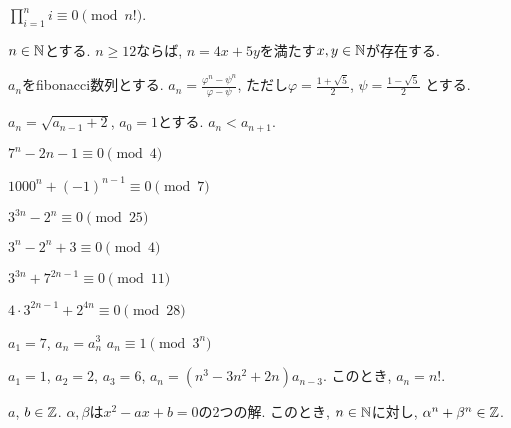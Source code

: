 \begin{prop}
$\prod_{i=1}^n i \equiv 0 \pmod{n!}$.
\end{prop}



\begin{prop}
$n\in\mathbb{N}$とする.
  $n\geq 12$ならば, $n=4x+5y$を満たす$x,y\in\mathbb{N}$が存在する.
\end{prop}


\begin{prop}
  $a_n$をfibonacci数列とする.
  $a_n=\frac{\varphi^n-\psi^n}{\varphi-\psi}$,
  ただし$\varphi=\frac{1+\sqrt{5}}{2}$,
  $\psi=\frac{1-\sqrt{5}}{2}$
  とする.
\end{prop}

\begin{prop}
  $a_n=\sqrt{a_{n-1}+2}$, $a_0=1$とする.
  $a_n<a_{n+1}$.
\end{prop}


\begin{prop}
  $7^n-2n-1\equiv 0\pmod{4}$
\end{prop}

\begin{prop}
  $1000^n+(-1)^{n-1}\equiv 0\pmod{7}$
\end{prop}

\begin{prop}
  $3^{3n}-2^n\equiv 0\pmod{25}$
\end{prop}

\begin{prop}
  $3^{n}-2^n+3\equiv 0\pmod{4}$
\end{prop}

\begin{prop}
  $3^{3n}+7^{2n-1}\equiv 0\pmod{11}$
\end{prop}

\begin{prop}
  $4\cdot 3^{2n-1}+2^{4n}\equiv 0\pmod{28}$
\end{prop}

\begin{prop}
  $a_1=7$, $a_{n}=a_{n}^3$
  $a_n\equiv 1\pmod{3^n}$
\end{prop}

\begin{prop}
  $a_1=1$, $a_2=2$, $a_3=6$,
  $a_n=(n^3-3n^2+2n)a_{n-3}$.
  このとき, $a_n=n!$.
\end{prop}



\begin{prop}
  $a$, $b\in\mathbb{Z}$.
  $\alpha, \beta$は$x^2-ax+b=0$の2つの解.
  このとき, $n\in\mathbb{N}$に対し,
  $\alpha^n+\beta^n\in \mathbb{Z}$.
\end{prop}


